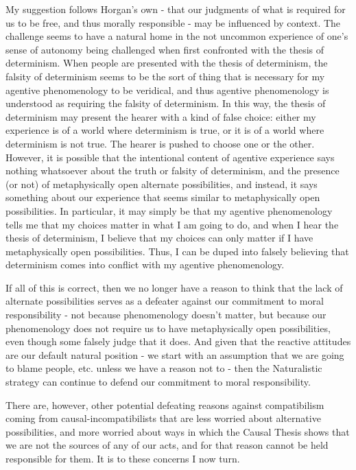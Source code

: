 \documentclass[phd,12pt,oneside,paper=letterpaper]{ubcthesis}
\begin{document}
My suggestion follows Horgan's own - that our judgments of what is required for us to be free, and thus morally responsible - may be influenced by context. The challenge seems to have a natural home in the not uncommon experience of one's sense of autonomy being challenged when first confronted with the thesis of determinism. When people are presented with the thesis of determinism, the falsity of determinism seems to be the sort of thing that is necessary for my agentive phenomenology to be veridical, and thus agentive phenomenology is understood as requiring the falsity of determinism. In this way, the thesis of determinism may present the hearer with a kind of false choice: either my experience is of a world where determinism is true, or it is of a world where determinism is not true. The hearer is pushed to choose one or the other. However, it is possible that the intentional content of agentive experience says nothing whatsoever about the truth or falsity of determinism, and the presence (or not) of metaphysically open alternate possibilities, and instead, it says something about our experience that seems similar to metaphysically open possibilities. In particular, it may simply be that my agentive phenomenology tells me that my choices matter in what I am going to do, and when I hear the thesis of determinism, I believe that my choices can only matter if I have metaphysically open possibilities. Thus, I can be duped into falsely believing that determinism comes into conflict with my agentive phenomenology. 

If all of this is correct, then we no longer have a reason to think that the lack of alternate possibilities serves as a defeater against our commitment to moral responsibility - not because phenomenology doesn't matter, but because our phenomenology does not require us to have metaphysically open possibilities, even though some falsely judge that it does. And given that the reactive attitudes are our default natural position - we start with an assumption that we are going to blame people, etc. unless we have a reason not to - then the Naturalistic strategy can continue to defend our commitment to moral responsibility. 

There are, however, other potential defeating reasons against compatibilism coming from causal-incompatibilists that are less worried about alternative possibilities, and more worried about ways in which the Causal Thesis shows that we are not the sources of any of our acts, and for that reason cannot be held responsible for them. It is to these concerns I now turn. 
\end{document}

